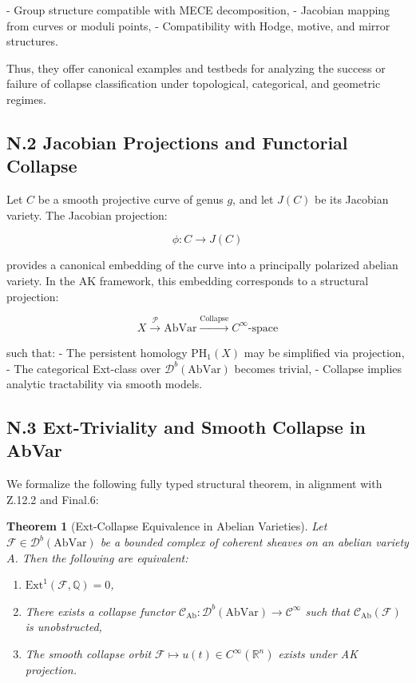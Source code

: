 \documentclass[11pt]{article}
\newtheorem{theorem}{Theorem}[section]
\begin{document}
\begin{axiom}
\begin{axiom}
{{- Group structure compatible with MECE decomposition,
- Jacobian mapping from curves or moduli points,
- Compatibility with Hodge, motive, and mirror structures.

Thus, they offer canonical examples and testbeds for analyzing the success or failure of collapse classification under topological, categorical, and geometric regimes.

\subsection*{N.2 Jacobian Projections and Functorial Collapse}

Let \( C \) be a smooth projective curve of genus \( g \), and let \( J(C) \) be its Jacobian variety.  
The Jacobian projection:

\[
\phi: C \longrightarrow J(C)
\]

provides a canonical embedding of the curve into a principally polarized abelian variety.  
In the AK framework, this embedding corresponds to a structural projection:

\[
X \xrightarrow{\mathcal{P}} \mathrm{AbVar} \xrightarrow{\text{Collapse}} C^\infty\text{-space}
\]

such that:
- The persistent homology \( \mathrm{PH}_1(X) \) may be simplified via projection,
- The categorical Ext-class over \( \mathcal{D}^b(\mathrm{AbVar}) \) becomes trivial,
- Collapse implies analytic tractability via smooth models.

\subsection*{N.3 Ext-Triviality and Smooth Collapse in AbVar}

We formalize the following fully typed structural theorem, in alignment with Z.12.2 and Final.6:

\begin{theorem}[Ext-Collapse Equivalence in Abelian Varieties]
Let \( \mathcal{F} \in \mathcal{D}^b(\mathrm{AbVar}) \) be a bounded complex of coherent sheaves on an abelian variety \( A \).  
Then the following are equivalent:

\begin{enumerate}
  \item \( \mathrm{Ext}^1(\mathcal{F}, \mathbb{Q}) = 0 \),
  \item There exists a collapse functor \( \mathcal{C}_{\mathrm{Ab}} : \mathcal{D}^b(\mathrm{AbVar}) \to \mathcal{C}^\infty \)  
  such that \( \mathcal{C}_{\mathrm{Ab}}(\mathcal{F}) \) is unobstructed,
  \item The smooth collapse orbit \( \mathcal{F} \mapsto u(t) \in C^\infty(\mathbb{R}^n) \) exists under AK projection.
\end{enumerate}
\end{theorem}

}}
\end{axiom}
\end{axiom}
\end{document}
